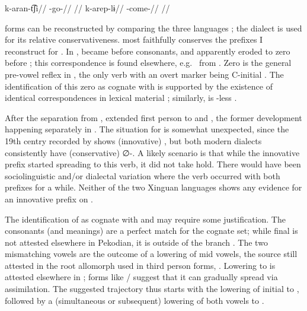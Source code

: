  \ikpeng \parencite[][80]{ikpengpacheco2001}
\begingl
\gla k-aran-t͡ʃi//
\glb {}-go-//
\glft {}//
\endgl
{}
\begingl
\gla k-arep-lɨ//
\glb {}-come-//
\glft {}//
\endgl
\xe




\PPek forms can be reconstructed by comparing the three languages ; the \ebakairi dialect is used for its relative conservativeness.
\arara most faithfully conserves the prefixes I reconstruct for \PPek.
In \bakairi,  became  before consonants, and apparently eroded to zero before ; this correspondence is found elsewhere, e.g.\  \parencite{meira2005southern} from \PC {}  \parencite[4]{gildea2007greenberg}.
Zero is the general pre-vowel reflex in \ikpeng, the only verb with an overt marker being C-initial .
The identification of this zero as cognate with \arara {} is supported by the existence of identical correspondences in lexical material ; similarly, \ebakairi {} is -less  \parencite[39]{pinto2022bakairi}.



After the separation from \arara, \ikpeng extended first person  to  and , the former development happening separately in \bakairi.
The situation for  is somewhat unexpected, since the 19th centry \bakairi recorded by \textcite{von1892bakairi} shows (innovative) , but both modern dialects consistently have (conservative) ∅-.
A likely scenario is that while the innovative prefix started spreading to this verb, it did not take hold.
There would have been sociolinguistic and/or dialectal variation where the verb occurred with both prefixes for a while.
Neither of the two Xinguan languages shows any evidence for an innovative prefix on .

The identification of \ikpeng {}  as cognate with \arara {} and \bakairi {} may require some justification.
The consonants (and meanings) are a perfect match for the cognate set; while final  is not attested elsewhere in Pekodian, it is outside of the branch .
The two mismatching vowels are the outcome of a lowering of mid vowels, the source still attested in the root allomorph used in third person forms,  \parencite[54]{ikpengpacheco2001}.
Lowering to  is attested elsewhere in \ikpeng {}; forms like / suggest that it can gradually spread via assimilation.
The suggested trajectory thus starts with the lowering of initial  to  , followed by a (simultaneous or subsequent) lowering of both vowels to .

